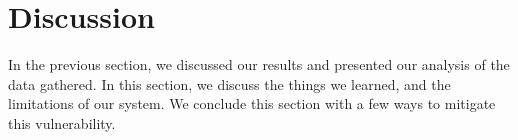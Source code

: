 \section{Discussion}
    In the previous section, we discussed our results and presented our analysis of the data gathered. In this section, we discuss the things we learned, and the limitations of our system. We conclude this section with a few ways to mitigate this vulnerability.



